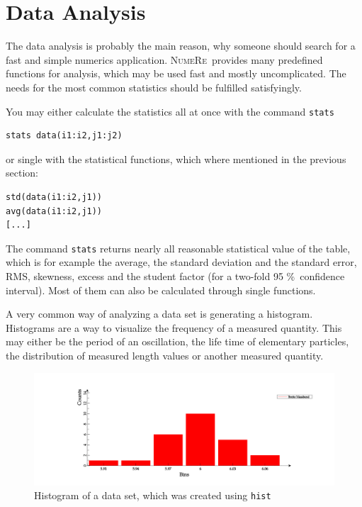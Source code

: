 \documentclass[DIV=14,headsepline,footsepline]{scrbook}
\newcommand{\NR}{\textsc{Nu\-me\-Re}}
\begin{document}
			\section{Data Analysis}
				The data analysis is probably the main reason, why someone should search for a fast and simple numerics application. \NR\ provides many predefined functions for analysis, which may be used fast and mostly uncomplicated. The needs for the most common statistics should be fulfilled satisfyingly.
				
				You may either calculate the statistics all at once with the command \lstinline+stats+
				\begin{lstlisting}
stats data(i1:i2,j1:j2)
				\end{lstlisting}
				or single with the statistical functions, which where mentioned in the previous section:
				\begin{lstlisting}
std(data(i1:i2,j1))
avg(data(i1:i2,j1))
[...]
				\end{lstlisting}
				The command \lstinline+stats+ returns nearly all reasonable statistical value of the table, which is for example the average, the standard deviation and the standard error, RMS, skewness, excess and the student factor (for a two-fold 95 \%\ confidence interval). Most of them can also be calculated through single functions.
				
				A very common way of analyzing a data set is generating a histogram. Histograms are a way to visualize the frequency of a measured quantity. This may either be the period of an oscillation, the life time of elementary particles, the distribution of measured length values or another measured quantity.
				\begin{figure}[htb]%
					\centering
					\includegraphics[width=\textwidth]{_graphics/histogramm.png}
					\caption{Histogram of a data set, which was created using \lstinline{hist}}
					\label{fig:histogramm}
				\end{figure}
				
\end{document}
